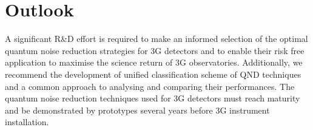 \section{Outlook}
A significant R\&D effort is required to make an informed selection of the optimal quantum noise reduction strategies for 3G detectors and to enable their risk free application to maximise the science return of 3G observatories. Additionally, we recommend the development of unified classification scheme of QND techniques and a common approach to analysing and comparing their performances. The quantum noise reduction techniques used for 3G detectors must reach maturity and be demonstrated by prototypes several years before 3G instrument installation.  


